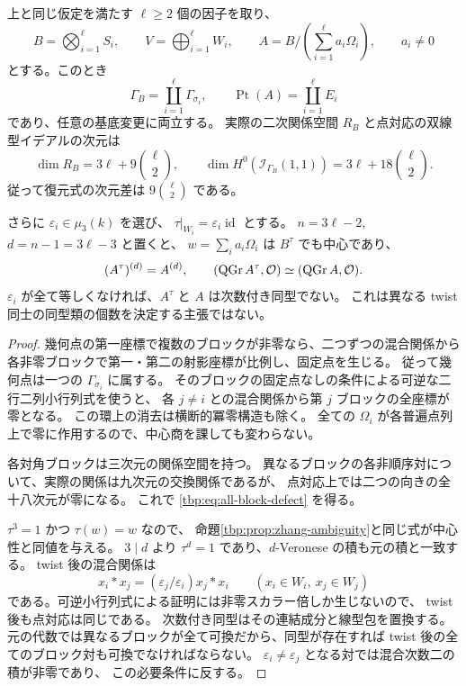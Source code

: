 \begin{corollary}[任意個の満支持ブロック]
\label{tbp:cor:all-blocks}
上と同じ仮定を満たす $\ell\ge2$ 個の因子を取り、
\[
 B=\bigotimes_{i=1}^{\ell}S_i,\qquad
 V=\bigoplus_{i=1}^{\ell}W_i,\qquad
 A=B/\left(\sum_{i=1}^{\ell}a_i\Omega_i\right),\qquad a_i\ne0
\]
とする。このとき
\begin{equation}\label{tbp:eq:all-block-points}
 \Gamma_B=\coprod_{i=1}^{\ell}\Gamma_{\sigma_i},\qquad
 \operatorname{Pt}(A)=\coprod_{i=1}^{\ell}E_i
\end{equation}
であり、任意の基底変更に両立する。
実際の二次関係空間 $R_B$ と点対応の双線型イデアルの次元は
\begin{equation}\label{tbp:eq:all-block-defect}
 \dim R_B=3\ell+9\binom\ell2,\qquad
 \dim H^0(\mathcal I_{\Gamma_B}(1,1))
       =3\ell+18\binom\ell2.
\end{equation}
従って復元式の次元差は $9\binom\ell2$ である。

さらに $\varepsilon_i\in\mu_3(k)$ を選び、
$\tau|_{W_i}=\varepsilon_i\operatorname{id}$ とする。
$n=3\ell-2$, $d=n-1=3\ell-3$ と置くと、
$w=\sum_i a_i\Omega_i$ は $B^\tau$ でも中心であり、
\[
 (A^\tau)^{(d)}=A^{(d)},\qquad
 (\operatorname{QGr}A^\tau,\mathcal O)\simeq(\operatorname{QGr}A,\mathcal O).
\]
$\varepsilon_i$ が全て等しくなければ、$A^\tau$ と $A$ は次数付き同型でない。
これは異なる twist 同士の同型類の個数を決定する主張ではない。
\end{corollary}

\begin{proof}
幾何点の第一座標で複数のブロックが非零なら、二つずつの混合関係から
各非零ブロックで第一・第二の射影座標が比例し、固定点を生じる。
従って幾何点は一つの $\Gamma_{\sigma_i}$ に属する。
そのブロックの固定点なしの条件による可逆な二行二列小行列式を使うと、
各 $j\ne i$ との混合関係から第 $j$ ブロックの全座標が零となる。
この環上の消去は横断的冪零構造も除く。
全ての $\Omega_i$ が各普遍点列上で零に作用するので、中心商を課しても変わらない。

各対角ブロックは三次元の関係空間を持つ。
異なるブロックの各非順序対について、実際の関係は九次元の交換関係であるが、
点対応上では二つの向きの全十八次元が零になる。
これで \eqref{tbp:eq:all-block-defect} を得る。

$\tau^3=1$ かつ $\tau(w)=w$ なので、
命題\ref{tbp:prop:zhang-ambiguity}と同じ式が中心性と同値を与える。
$3\mid d$ より $\tau^d=1$ であり、$d$-Veronese の積も元の積と一致する。
twist 後の混合関係は
\[
 x_i*x_j=(\varepsilon_j/\varepsilon_i)x_j*x_i
 \qquad(x_i\in W_i,\ x_j\in W_j)
\]
である。可逆小行列式による証明には非零スカラー倍しか生じないので、
twist 後も点対応は同じである。
次数付き同型はその連結成分と線型包を置換する。
元の代数では異なるブロックが全て可換だから、同型が存在すれば
twist 後の全てのブロック対も可換でなければならない。
$\varepsilon_i\ne\varepsilon_j$ となる対では混合次数二の積が非零であり、
この必要条件に反する。
\end{proof}


